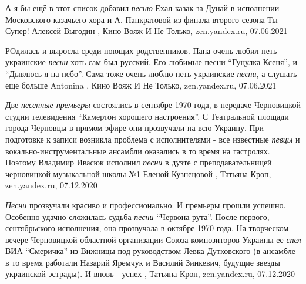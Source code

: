А я бы ещё в этот список добавил \emph{песню} Ехал казак за Дунай в исполнении
Московского казачьего хора и А. Панкратовой из финала второго сезона Ты Супер!
Алексей Выгодин
, 
Кино Вояж И Не Только, zen.yandex.ru, 07.06.2021

РОдилась и выросла среди поющих родственников. Папа очень любил петь украинские
\emph{песни} хоть сам был русский. Его любимые песни \enquote{Гуцулка Ксеня}, и \enquote{Дывлюсь я на
небо}. Сама тоже очень люблю петь украинские \emph{песни}, а слушать еще больше
Antonina
, 
Кино Вояж И Не Только, zen.yandex.ru, 07.06.2021

Две \emph{песенные премьеры} состоялись в сентябре 1970 года, в передаче Черновицкой
студии телевидения \enquote{Камертон хорошего настроения}. С Театральной площади города
Черновцы в прямом эфире они прозвучали на всю Украину.  При подготовке к записи
возникла проблема с исполнителями - все известные\emph{ певцы} и
вокально-инструментальные ансамбли оказались в то время на гастролях. Поэтому
Владимир Ивасюк исполнил \emph{песни} в дуэте с преподавательницей черновицкой
музыкальной школы №1 Еленой Кузнецовой
, 
Татьяна Кроп, zen.yandex.ru, 07.12.2020

\emph{Песни} прозвучали красиво и профессионально. И премьеры прошли успешно. Особенно
удачно сложилась судьба \emph{песни} \enquote{Червона рута}. После первого, сентябрьского
исполнения, она прозвучала в октябре 1970 года. На творческом вечере
Черновицкой областной организации Союза композиторов Украины ее \emph{спел} ВИА
\enquote{Смеричка} из Вижницы под руководством Левка Дутковского (в ансамбле в то время
работали Назарий Яремчук и Василий Зинкевич, будущие звезды украинской
эстрады). И вновь - успех
, 
Татьяна Кроп, zen.yandex.ru, 07.12.2020
